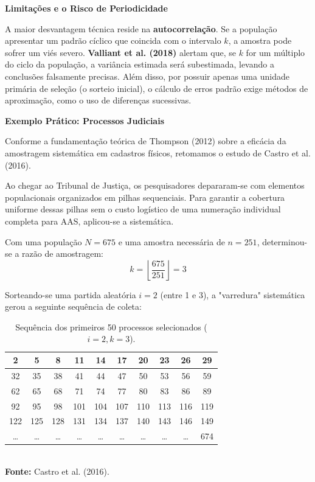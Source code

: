 \textbf{Limitações e o Risco de Periodicidade} \vskip0.3cm

A maior desvantagem técnica reside na \textbf{autocorrelação}. Se a população apresentar um padrão cíclico que coincida com o intervalo $k$, a amostra pode sofrer um viés severo. \textbf{Valliant et al. (2018)} alertam que, se $k$ for um múltiplo do ciclo da população, a variância estimada será subestimada, levando a conclusões falsamente precisas. Além disso, por possuir apenas uma unidade primária de seleção (o sorteio inicial), o cálculo de erros padrão exige métodos de aproximação, como o uso de diferenças sucessivas. \vskip0.3cm


\newpage
\textbf{Exemplo Prático: Processos Judiciais}
\vskip0.3cm

Conforme a fundamentação teórica de Thompson (2012) sobre a eficácia da amostragem sistemática em cadastros físicos, retomamos o estudo de Castro et al. (2016). \vskip0.3cm

Ao chegar ao Tribunal de Justiça, os pesquisadores depararam-se com elementos populacionais organizados em pilhas sequenciais. Para garantir a cobertura uniforme dessas pilhas sem o custo logístico de uma numeração individual completa para AAS, aplicou-se a sistemática. \vskip0.3cm

Com uma população $N = 675$ e uma amostra necessária de $n = 251$, determinou-se a razão de amostragem:$$k = \left\lfloor \frac{675}{251} \right\rfloor = 3$$

Sorteando-se uma partida aleatória $i=2$ (entre 1 e 3), a "varredura" sistemática gerou a seguinte sequência de coleta:


\begin{table}[!htb]
\centering
\caption{Sequência dos primeiros 50 processos selecionados ($i=2, k=3$).}
\label{tab:amostra_sistematica_detalhada}
\vspace{0.2cm}
\begin{tabular}{|c|c|c|c|c|c|c|c|c|c|}
\hline\hline
2  & 5  & 8  & 11 & 14 & 17 & 20 & 23 & 26 & 29 \\ \hline
32 & 35 & 38 & 41 & 44 & 47 & 50 & 53 & 56 & 59 \\ \hline
62 & 65 & 68 & 71 & 74 & 77 & 80 & 83 & 86 & 89 \\ \hline
92 & 95 & 98 & 101 & 104 & 107 & 110 & 113 & 116 & 119 \\ \hline
122 & 125 & 128 & 131 & 134 & 137 & 140 & 143 & 146 & 149 \\ \hline
\dots & \dots & \dots & \dots & \dots & \dots & \dots & \dots & \dots & 674 \\
\hline\hline
\end{tabular}
\vspace{0.1cm}
\small \\ \textbf{Fonte:} Castro et al. (2016).
\end{table}


